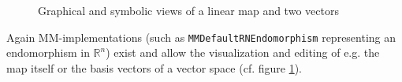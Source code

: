 \documentclass[a4paper,12pt]{article}
\newcommand{\codename}[1]{\texttt{\small #1}}
\begin{document}
\begin{figure}[h!]
  \centering
  \hspace{0.0cm}
  \hspace{0.0cm}
  \caption{Graphical and symbolic views of a linear map and two vectors}
  \label{fig:linMap}
\end{figure}

Again MM-implementations (such as \codename{MMDefaultRNEndomorphism} representing an endomorphism in $\mathbb{R}^n$)
exist and allow the visualization and editing of e.g. the map itself or the basis vectors of a vector space
(cf. figure \ref{fig:linMap}).





\end{document}
